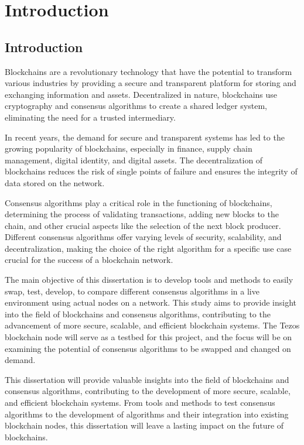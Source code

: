 \chapter{Introduction}
\label{chap:int}


\section{Introduction}

Blockchains are a revolutionary technology that have the potential to transform various industries by providing a secure and transparent platform for storing and exchanging information and assets. Decentralized in nature, blockchains use cryptography and consensus algorithms to create a shared ledger system, eliminating the need for a trusted intermediary.

In recent years, the demand for secure and transparent systems has led to the growing popularity of blockchains, especially in finance, supply chain management, digital identity, and digital assets. The decentralization of blockchains reduces the risk of single points of failure and ensures the integrity of data stored on the network.

Consensus algorithms play a critical role in the functioning of blockchains, determining the process of validating transactions, adding new blocks to the chain, and other crucial aspects like the selection of the next block producer. Different consensus algorithms offer varying levels of security, scalability, and decentralization, making the choice of the right algorithm for a specific use case crucial for the success of a blockchain network.


The main objective of this dissertation is to develop tools and methods to easily swap, test, develop, to compare different consensus algorithms in a live environment using actual nodes on a network. This study aims to provide insight into the field of blockchains and consensus algorithms, contributing to the advancement of more secure, scalable, and efficient blockchain systems. The Tezos \cite{goodman2014tezos} blockchain node will serve as a testbed for this project, and the focus will be on examining the potential of consensus algorithms to be swapped and changed on demand.

This dissertation will provide valuable insights into the field of blockchains and consensus algorithms, contributing to the development of more secure, scalable, and efficient blockchain systems. From tools and methods to test consensus algorithms to the development of algorithms and their integration into existing blockchain nodes, this dissertation will leave a lasting impact on the future of blockchains.

